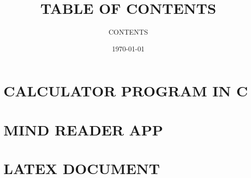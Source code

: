 \documentclass{article}
\begin{document}
\title{TABLE OF CONTENTS}
\author{CONTENTS}
\date{\today}
\maketitle

\section{CALCULATOR PROGRAM IN C}

\section{MIND READER APP}

\section{LATEX DOCUMENT}



\printindex  %
\end{document}
